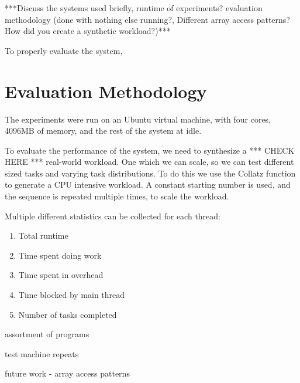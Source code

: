 
***Discuss the systems used briefly, runtime of experiments? evaluation methodology (done with nothing else running?, Different array access patterns? How did you create a synthetic workload?)***

To properly evaluate the system, 



\section{Evaluation Methodology}

The experiments were run on an Ubuntu virtual machine, with four cores, 4096MB of memory, and the rest of the system at idle.

To evaluate the performance of the system, we need to synthesize a *** CHECK HERE *** real-world workload. One which we can scale, so we can test different sized tasks and varying task distributions. To do this we use the Collatz function to generate a CPU intensive workload. A constant starting number is used, and the sequence is repeated multiple times, to scale the workload.

Multiple different statistics can be collected for each thread:

\begin{enumerate}
	\item Total runtime
	\item Time spent doing work
	\item Time spent in overhead
	\item Time blocked by main thread
	\item Number of tasks completed
\end{enumerate}

assortment of programs

test machine
repeats

future work - array access patterns